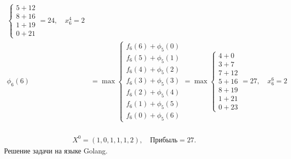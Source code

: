 \documentclass{article}
\begin{document}
\[\begin{aligned}
\begin{cases}
                                                  5 + 12 \\
                                                  8 + 16 \\
                                                  1 + 19 \\
                                                  0 + 21
                                              \end{cases} = 24, \quad x_6^4 = 2               \\
        \phi_6(6) & = \max \begin{cases}
                               f_6(6) + \phi_5(0) \\
                               f_6(5) + \phi_5(1) \\
                               f_6(4) + \phi_5(2) \\
                               f_6(3) + \phi_5(3) \\
                               f_6(2) + \phi_5(4) \\
                               f_6(1) + \phi_5(5) \\
                               f_6(0) + \phi_5(6)
                           \end{cases} = \max \begin{cases}
                                                  4 + 0  \\
                                                  3 + 7  \\
                                                  7 + 12 \\
                                                  5 + 16 \\
                                                  8 + 19 \\
                                                  1 + 21 \\
                                                  0 + 23
                                              \end{cases} = 27, \quad x_6^6 = 2               \\
    \end{aligned}
\]

\[
    \begin{aligned}
         & X^0 = (1, 0, 1, 1, 1, 2), \quad \text{Прибыль} = 27.
    \end{aligned}
\]
Решение задачи на языке Golang.
\end{document}
